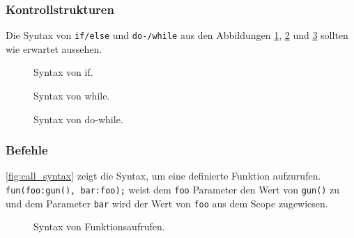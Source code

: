     \subsubsection{Kontrollstrukturen}
    \label{sssec:Kontrollstrukturen}
      Die Syntax von \lstinline[style=MyMacroStyleIn]$if/else$ und \lstinline[style=MyMacroStyleIn]$do-/while$ aus den Abbildungen \ref{fig:if_syntax}, \ref{fig:while_syntax} und \ref{fig:do_while_syntax} sollten wie erwartet aussehen.
      \begin{figure}[H]
        \centering
        \caption{Syntax von if.}
        \label{fig:if_syntax}
      \end{figure}

      \begin{figure}[H]
        \centering
        \caption{Syntax von while.}
        \label{fig:while_syntax}
      \end{figure}

      \begin{figure}[H]
        \centering
        \caption{Syntax von do-while.}
        \label{fig:do_while_syntax}
      \end{figure}

    \subsubsection{Befehle}
    \label{sssec:Befehle}
      \autoref{fig:call_syntax} zeigt die Syntax, um eine definierte Funktion aufzurufen. \lstinline[style=MyMacroStyleIn]$fun(foo:gun(), bar:foo);$ weist dem \lstinline[style=MyMacroStyleIn]$foo$ Parameter den Wert von \lstinline[style=MyMacroStyleIn]$gun()$ zu und dem Parameter \lstinline[style=MyMacroStyleIn]$bar$ wird der Wert von \lstinline[style=MyMacroStyleIn]$foo$ aus dem Scope zugewiesen.
      \begin{figure}[H]
        \centering
        \caption{Syntax von Funktionsaufrufen.}
        \label{fig:call_syntax}
      \end{figure}


